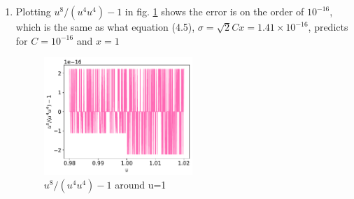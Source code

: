 \documentclass{article}
\begin{document}
\begin{enumerate}
\begin{enumerate}
    \item Plotting $u^8/(u^4u^4)-1$ in fig. \ref{fig:3d} shows the error is on the order of $10^{-16}$, which is the same as what equation (4.5), $\sigma = \sqrt{2}C x = 1.41\times10^{-16}$, predicts for $C=10^{-16}$ and $x=1$
    \begin{figure}[h]
        \centering 
        \includegraphics[width=0.53\textwidth]{3d.pdf}
        \caption{$u^8/(u^4u^4) - 1$ around u=1}
        \label{fig:3d}
    \end{figure}

\end{enumerate}

\end{enumerate}
\end{document}
